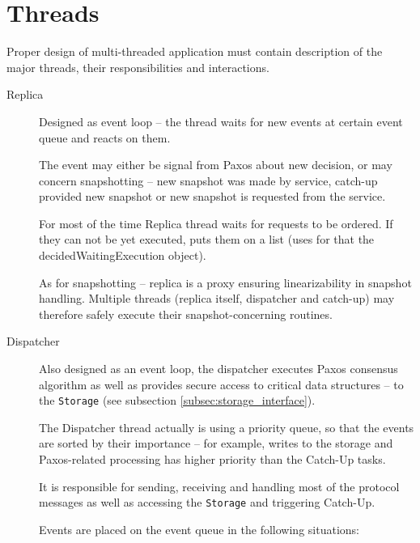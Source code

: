 \section{Threads}
\label{sec:threads}

Proper design of multi-threaded application must contain description of the major threads, their responsibilities and interactions.

\begin{description}
  \item[Replica] \hfill
    
    Designed as event loop -- the thread waits for new events at certain event queue and reacts on them.

    The event may either be signal from Paxos about new decision, or may concern snapshotting -- new snapshot was made by service, catch-up provided new snapshot or new snapshot is requested from the service.

    For most of the time Replica thread waits for requests to be ordered. If they can not be yet executed, puts them on a list (uses for that the decidedWaitingExecution object).
    
    As for snapshotting -- replica is a proxy ensuring linearizability in snapshot handling.
    Multiple threads (replica itself, dispatcher and catch-up) may therefore safely execute their snapshot-concerning routines.
    
  \item[Dispatcher] \hfill
    
    Also designed as an event loop, the dispatcher executes Paxos consensus algorithm as well as provides secure access to critical data structures -- to the \texttt{Storage} (see subsection \ref{subsec:storage_interface}).
    
    The Dispatcher thread actually is using a priority queue, so that the events are sorted by their importance -- for example, writes to the storage and Paxos-related processing has higher priority than the Catch-Up tasks.
    
    It is responsible for sending, receiving and handling most of the protocol messages as well as accessing the \texttt{Storage} and triggering Catch-Up.
    
    Events are placed on the event queue in the following situations:
    

\end{description}
